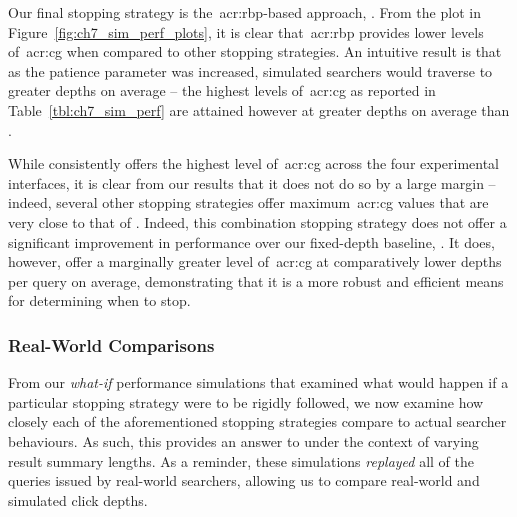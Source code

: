 Our final stopping strategy is the~\gls{acr:rbp}-based approach, . From the plot in Figure~\ref{fig:ch7_sim_perf_plots}, it is clear that~\gls{acr:rbp} provides lower levels of~\gls{acr:cg} when compared to other stopping strategies. An intuitive result is that as the patience parameter was increased, simulated searchers would traverse to greater depths on average -- the highest levels of~\gls{acr:cg} as reported in Table~\ref{tbl:ch7_sim_perf} are attained however at greater depths on average than .

While  consistently offers the highest level of~\gls{acr:cg} across the four experimental interfaces, it is clear from our results that it does not do so by a large margin -- indeed, several other stopping strategies offer maximum~\gls{acr:cg} values that are very close to that of . Indeed, this combination stopping strategy does not offer a significant improvement in performance over our fixed-depth baseline, . It does, however, offer a marginally greater level of~\gls{acr:cg} at comparatively lower depths per query on average, demonstrating that it is a more robust and efficient means for determining when to stop.

\subsubsection{Real-World Comparisons}\label{sec:snippets:simulations:results:comparisons}
From our \emph{what-if} performance simulations that examined what would happen if a particular stopping strategy were to be rigidly followed, we now examine how closely each of the aforementioned stopping strategies compare to actual searcher behaviours. As such, this provides an answer to  under the context of varying result summary lengths. As a reminder, these simulations \emph{replayed} all of the queries issued by real-world searchers, allowing us to compare real-world and simulated click depths.

